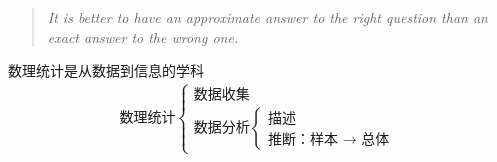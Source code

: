 \begin{quote}
	\textit{It is better to have an approximate answer to the right question than an exact answer to the wrong one.}

\end{quote}
数理统计是从数据到信息的学科
\begin{align*}
	\text{数理统计}\begin{cases}
		\text{数据收集}\\
		\text{数据分析}\begin{cases}
			\text{描述}\\
			\text{推断：样本 } \to \text{ 总体}
		\end{cases}
	\end{cases}
\end{align*}